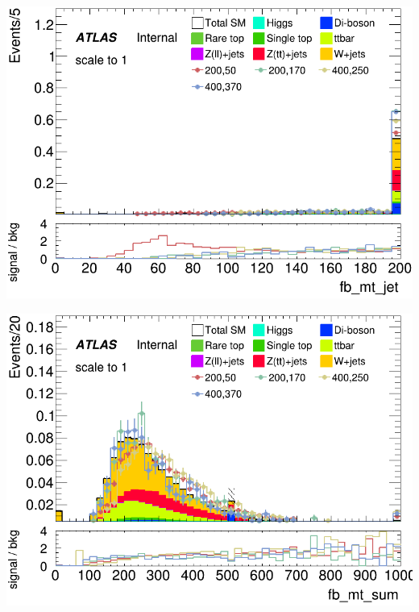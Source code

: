 \documentclass[usenames,dvipsnames]{beamer}
\begin{document}
\begin{frame}
\begin{minipage}{0.25\textwidth}
        \includegraphics[width=\textwidth]{graphics/LH_met_sig/LH_fb_mt_jet_norm.png}
    \end{minipage}
    \hfill
    \begin{minipage}{0.25\textwidth}
        \centering
        \includegraphics[width=\textwidth]{graphics/LH_met_sig/LH_fb_mt_sum_norm.png}
    \end{minipage}
\end{frame}
\end{document}
